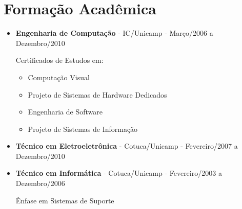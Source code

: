 \documentclass[a4paper,10pt]{article}
\begin{document}
  \section{Formação Acadêmica}
    \begin{itemize}
      \item  
        \textbf{Engenharia de Computação} - IC/Unicamp - Março/2006 a Dezembro/2010

        Certificados de Estudos em:
        \begin{itemize}
          \item Computação Visual
          \item Projeto de Sistemas de Hardware Dedicados
          \item Engenharia de Software
          \item Projeto de Sistemas de Informação
        \end{itemize}



      \item  
        \textbf{Técnico em Eletroeletrônica} - Cotuca/Unicamp - Fevereiro/2007 a Dezembro/2010


      \item  
        \textbf{Técnico em Informática} - Cotuca/Unicamp - Fevereiro/2003 a Dezembro/2006

        Ênfase em Sistemas de Suporte


    \end{itemize}
%     
% 
% 
\end{document}
